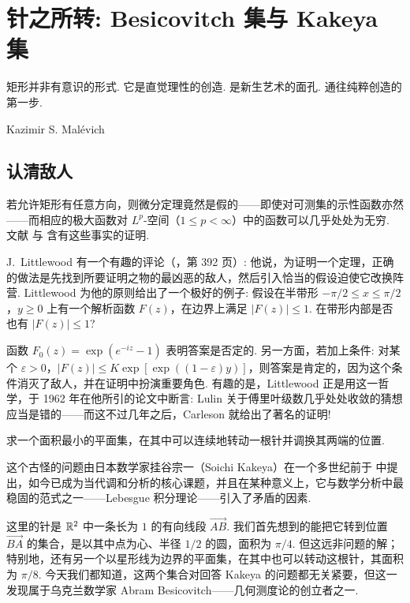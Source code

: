 
\chapter{针之所转: Besicovitch 集与 Kakeya 集}

\epigraph{矩形并非有意识的形式. 它是直觉理性的创造. 是新生艺术的面孔. 通往纯粹创造的第一步.}{Kazimir S. Malévich}

\section{认清敌人}

若允许矩形有任意方向，则微分定理竟然是假的——即使对可测集的示性函数亦然——而相应的极大函数对 $L^p$-空间（$1 \leq p < \infty$）中的函数可以几乎处处为无穷. 文献 \cite{b46} 与 \cite{b32} 含有这些事实的证明.

J.~Littlewood 有一个有趣的评论（\cite{b69}，第 392 页）: 他说，为证明一个定理，正确的做法是先找到所要证明之物的最凶恶的敌人，然后引入恰当的假设迫使它改换阵营. Littlewood 为他的原则给出了一个极好的例子: 假设在半带形 $-\pi/2 \leq x \leq \pi/2$，$y \geq 0$ 上有一个解析函数 $F(z)$，在边界上满足 $|F(z)| \leq 1$. 在带形内部是否也有 $|F(z)| \leq 1$?

函数 $F_0(z) = \exp(e^{-iz} - 1)$ 表明答案是否定的. 另一方面，若加上条件: 对某个 $\varepsilon > 0$，$|F(z)| \leq K\exp[\exp((1 - \varepsilon)y)]$，则答案是肯定的，因为这个条件消灭了敌人，并在证明中扮演重要角色. 有趣的是，Littlewood 正是用这一哲学，于 1962 年在他所引的论文中断言: Lulin 关于傅里叶级数几乎处处收敛的猜想应当是错的——而这不过几年之后，Carleson 就给出了著名的证明!

\begin{question}\label{ques:3.1}
求一个面积最小的平面集，在其中可以连续地转动一根针并调换其两端的位置.
\end{question}

这个古怪的问题由日本数学家挂谷宗一（Soichi Kakeya）在一个多世纪前于 \cite{b71} 中提出，如今已成为当代调和分析的核心课题，并且在某种意义上，它与数学分析中最稳固的范式之一——Lebesgue 积分理论——引入了矛盾的因素.

这里的针是 $\mathbb{R}^2$ 中一条长为 $1$ 的有向线段 $\overrightarrow{AB}$. 我们首先想到的能把它转到位置 $\overrightarrow{BA}$ 的集合，是以其中点为心、半径 $1/2$ 的圆，面积为 $\pi/4$. 但这远非问题的解；特别地，还有另一个以星形线为边界的平面集，在其中也可以转动这根针，其面积为 $\pi/8$. 今天我们都知道，这两个集合对回答 Kakeya 的问题都无关紧要，但这一发现属于乌克兰数学家 Abram Besicovitch——几何测度论的创立者之一.

